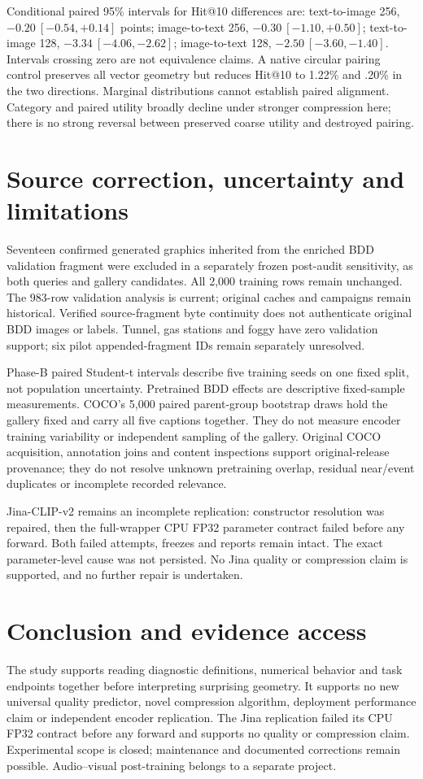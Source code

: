 \documentclass[11pt]{article}
\begin{document}
\ours{} Conditional paired 95\% intervals for Hit@10 differences are:
text-to-image 256, $-0.20\ [-0.54,+0.14]$ points; image-to-text 256,
$-0.30\ [-1.10,+0.50]$; text-to-image 128, $-3.34\ [-4.06,-2.62]$;
image-to-text 128, $-2.50\ [-3.60,-1.40]$.
\interp{} Intervals crossing zero are not equivalence claims.
\ours{} A native circular pairing control preserves all vector geometry but
reduces Hit@10 to 1.22\% and .20\% in the two directions.
\interp{} Marginal distributions cannot establish paired alignment. Category
and paired utility broadly decline under stronger compression here; there is
no strong reversal between preserved coarse utility and destroyed pairing.

\section{Source correction, uncertainty and limitations}
\ours{} Seventeen confirmed generated graphics inherited from the enriched BDD
validation fragment were excluded in a separately frozen post-audit sensitivity,
as both queries and gallery candidates. All 2,000 training rows remain unchanged.
The 983-row validation analysis is current; original caches and campaigns remain
historical. Verified source-fragment byte continuity does not authenticate original
BDD images or labels. Tunnel, gas stations and foggy have zero validation support;
six pilot appended-fragment IDs remain separately unresolved.

\interp{} Phase-B paired Student-t intervals describe five training seeds on one
fixed split, not population uncertainty. Pretrained BDD effects are descriptive
fixed-sample measurements. COCO's 5,000 paired parent-group bootstrap draws hold
the gallery fixed and carry all five captions together. They do not measure
encoder training variability or independent sampling of the gallery.
Original COCO acquisition, annotation joins and content inspections support
original-release provenance; they do not resolve unknown pretraining overlap,
residual near/event duplicates or incomplete recorded relevance.

\ours{} Jina-CLIP-v2 remains an incomplete replication: constructor resolution
was repaired, then the full-wrapper CPU FP32 parameter contract failed before
any forward. Both failed attempts, freezes and reports remain intact. The exact
parameter-level cause was not persisted. No Jina quality or compression claim
is supported, and no further repair is undertaken.

\section{Conclusion and evidence access}
\interp{} The study supports reading diagnostic definitions, numerical behavior
and task endpoints together before interpreting surprising geometry. It supports
no new universal quality predictor, novel compression algorithm, deployment
performance claim or independent encoder replication. \ours{} The Jina replication failed its CPU FP32 contract before any forward and
supports no quality or compression claim. Experimental scope is closed;
maintenance and documented corrections remain possible. Audio--visual post-training
belongs to a separate project.
\end{document}
